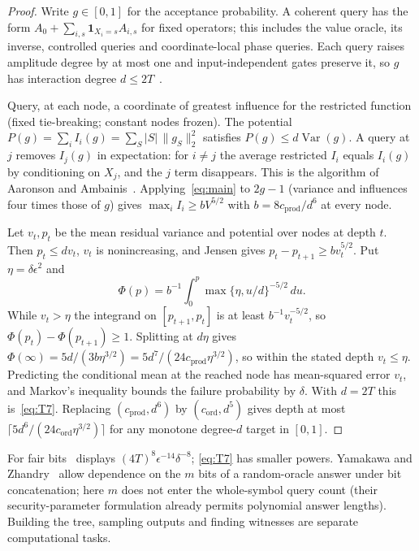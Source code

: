 \documentclass[11pt]{article}
\numberwithin{equation}{section}
\newcommand{\V}{\operatorname{Var}}
\newcommand{\Cgen}{c_{\mathrm{prod}}}
\newcommand{\Cmon}{c_{\mathrm{ord}}}
\theoremstyle{plain}
\theoremstyle{remark}
\begin{document}
\begin{proof}
Write $g\in[0,1]$ for the acceptance probability. A coherent query has the form $A_0+\sum_{i,s}\mathbf1_{X_i=s}A_{i,s}$ for fixed operators; this includes the value oracle, its inverse, controlled queries and coordinate-local phase queries. Each query raises amplitude degree by at most one and input-independent gates preserve it, so $g$ has interaction degree $d\le2T$~\cite{BBCMW01}.

Query, at each node, a coordinate of greatest influence for the restricted function (fixed tie-breaking; constant nodes frozen). The potential $P(g)=\sum_iI_i(g)=\sum_S|S|\,\|g_S\|_2^2$ satisfies $P(g)\le d\V(g)$. A query at $j$ removes $I_j(g)$ in expectation: for $i\ne j$ the average restricted $I_i$ equals $I_i(g)$ by conditioning on $X_j$, and the $j$ term disappears. This is the algorithm of Aaronson and Ambainis~\cite{AA14}. Applying~\eqref{eq:main} to $2g-1$ (variance and influences four times those of $g$) gives $\max_iI_i\ge bV^{5/2}$ with $b=8\Cgen/d^6$ at every node.

Let $v_t,p_t$ be the mean residual variance and potential over nodes at depth $t$. Then $p_t\le dv_t$, $v_t$ is nonincreasing, and Jensen gives $p_t-p_{t+1}\ge bv_t^{5/2}$. Put $\eta=\delta\epsilon^2$ and
\[
\Phi(p)=b^{-1}\int_0^p\max\{\eta,u/d\}^{-5/2}\,du .
\]
While $v_t>\eta$ the integrand on $[p_{t+1},p_t]$ is at least $b^{-1}v_t^{-5/2}$, so $\Phi(p_t)-\Phi(p_{t+1})\ge1$. Splitting at $d\eta$ gives $\Phi(\infty)=5d/(3b\eta^{3/2})=5d^7/(24\Cgen\eta^{3/2})$, so within the stated depth $v_t\le\eta$. Predicting the conditional mean at the reached node has mean-squared error $v_t$, and Markov's inequality bounds the failure probability by $\delta$. With $d=2T$ this is~\eqref{eq:T7}. Replacing $(\Cgen,d^6)$ by $(\Cmon,d^5)$ gives depth at most $\lceil5d^6/(24\Cmon\eta^{3/2})\rceil$ for any monotone degree-$d$ target in $[0,1]$.
\end{proof}

For fair bits~\cite[Section~1.3]{Tur26} displays $(4T)^8\epsilon^{-14}\delta^{-8}$; \eqref{eq:T7} has smaller powers. Yamakawa and Zhandry~\cite[Remark~6]{YZ24} allow dependence on the $m$ bits of a random-oracle answer under bit concatenation; here $m$ does not enter the whole-symbol query count (their security-parameter formulation already permits polynomial answer lengths). Building the tree, sampling outputs and finding witnesses are separate computational tasks.
\end{document}
